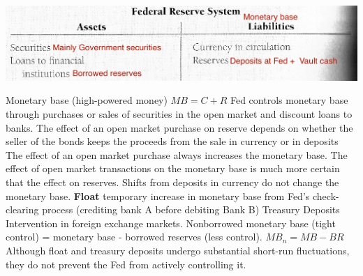 \documentclass[12pt]{examnotes}
\begin{document}

\includegraphics[scale=0.4]{./imgs/152.jpg}

\ra Monetary base (high-powered money) $MB=C+R$
\ra Fed controls monetary base through purchases or sales of securities in the open market and discount loans to banks.
\ra The effect of an open market purchase on reserve depends on whether the seller of the bonds keeps the proceeds from the sale in currency or in deposits
\ra The effect of an open market purchase always increases the monetary base.
\ra The effect of open market transactions on the monetary base is much more certain that the effect on reserves.
\ra Shifts from deposits in currency do not change the monetary base.
 {\bf Float} temporary increase in monetary base from Fed's check-clearing process (crediting bank A before debiting Bank B)
 Treasury Deposits 
 Intervention in foreign exchange markets.
\ra Nonborrowed monetary base (tight control) = monetary base - borrowed reserves (less control). $MB_n = MB - BR$
\ra Although float and treasury deposits undergo substantial short-run fluctuations, they do not prevent the Fed from actively controlling it.
\end{document}
